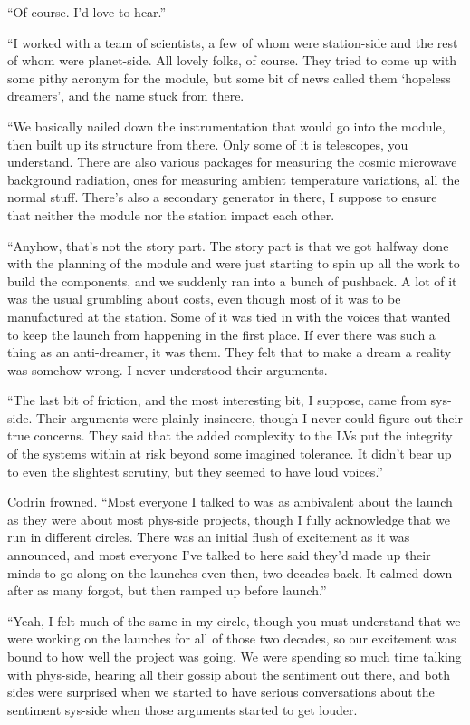 ``Of course. I'd love to hear.''

``I worked with a team of scientists, a few of whom were station-side and the rest of whom were planet-side. All lovely folks, of course. They tried to come up with some pithy acronym for the module, but some bit of news called them `hopeless dreamers', and the name stuck from there.

``We basically nailed down the instrumentation that would go into the module, then built up its structure from there. Only some of it is telescopes, you understand. There are also various packages for measuring the cosmic microwave background radiation, ones for measuring ambient temperature variations, all the normal stuff. There's also a secondary generator in there, I suppose to ensure that neither the module nor the station impact each other.

``Anyhow, that's not the story part. The story part is that we got halfway done with the planning of the module and were just starting to spin up all the work to build the components, and we suddenly ran into a bunch of pushback. A lot of it was the usual grumbling about costs, even though most of it was to be manufactured at the station. Some of it was tied in with the voices that wanted to keep the launch from happening in the first place. If ever there was such a thing as an anti-dreamer, it was them. They felt that to make a dream a reality was somehow wrong. I never understood their arguments.

``The last bit of friction, and the most interesting bit, I suppose, came from sys-side. Their arguments were plainly insincere, though I never could figure out their true concerns. They said that the added complexity to the LVs put the integrity of the systems within at risk beyond some imagined tolerance. It didn't bear up to even the slightest scrutiny, but they seemed to have loud voices.''

Codrin frowned. ``Most everyone I talked to was as ambivalent about the launch as they were about most phys-side projects, though I fully acknowledge that we run in different circles. There was an initial flush of excitement as it was announced, and most everyone I've talked to here said they'd made up their minds to go along on the launches even then, two decades back. It calmed down after as many forgot, but then ramped up before launch.''

``Yeah, I felt much of the same in my circle, though you must understand that we were working on the launches for all of those two decades, so our excitement was bound to how well the project was going. We were spending so much time talking with phys-side, hearing all their gossip about the sentiment out there, and both sides were surprised when we started to have serious conversations about the sentiment sys-side when those arguments started to get louder.

